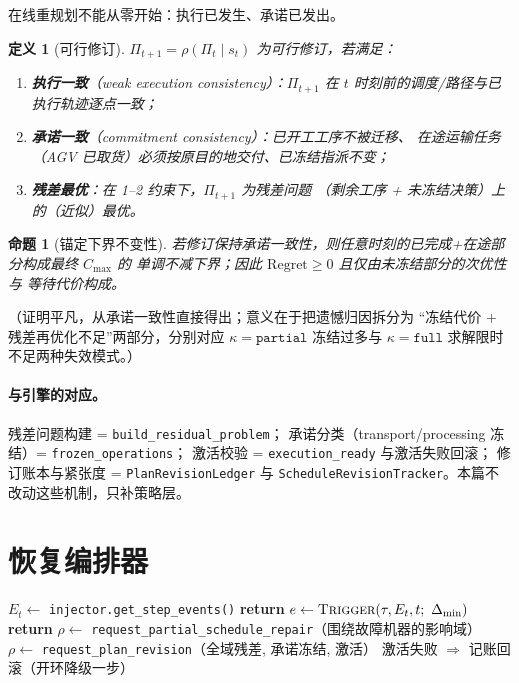 \documentclass[UTF8,12pt,a4paper]{ctexart}
\newtheorem{definition}{定义}
\newtheorem{proposition}{命题}
\newcommand{\Cmax}{C_{\max}}
\begin{document}
在线重规划不能从零开始：执行已发生、承诺已发出。

\begin{definition}[可行修订]
$\Pi_{t+1}=\rho(\Pi_t\mid s_t)$ 为可行修订，若满足：
\begin{enumerate}
  \item \textbf{执行一致}（weak execution consistency）：$\Pi_{t+1}$ 在
    $t$ 时刻前的调度/路径与已执行轨迹逐点一致；
  \item \textbf{承诺一致}（commitment consistency）：已开工工序不被迁移、
    在途运输任务（AGV 已取货）必须按原目的地交付、已冻结指派不变；
  \item \textbf{残差最优}：在 1--2 约束下，$\Pi_{t+1}$ 为残差问题
    （剩余工序 + 未冻结决策）上的（近似）最优。
\end{enumerate}
\end{definition}

\begin{proposition}[锚定下界不变性]
若修订保持承诺一致性，则任意时刻的已完成+在途部分构成最终 $\Cmax$ 的
单调不减下界；因此 $\mathrm{Regret}\ge 0$ 且仅由未冻结部分的次优性与
等待代价构成。
\end{proposition}
（证明平凡，从承诺一致性直接得出；意义在于把遗憾归因拆分为
``冻结代价 + 残差再优化不足''两部分，分别对应 $\kappa=\texttt{partial}$
冻结过多与 $\kappa=\texttt{full}$ 求解限时不足两种失效模式。）

\paragraph{与引擎的对应。}残差问题构建 = \texttt{build\_residual\_problem}；
承诺分类（transport/processing 冻结）= \texttt{frozen\_operations}；
激活校验 = \texttt{execution\_ready} 与激活失败回滚；
修订账本与紧张度 = \texttt{PlanRevisionLedger} 与
\texttt{ScheduleRevisionTracker}。本篇不改动这些机制，只补策略层。

\section{恢复编排器}\label{sec:orch}

\begin{algorithm}[h]
\caption{Recovery Orchestrator（每步调用）}
\begin{algorithmic}[1]
\State $E_t \gets$ \texttt{injector.get\_step\_events()}
 \State \textbf{return} \EndIf
\State $e \gets \textsc{Trigger}(\tau, E_t, t;\ \Delta_{\min})$ 
 \State \textbf{return} \EndIf
{}
  \State $\rho \gets$ \texttt{request\_partial\_schedule\_repair}（围绕故障机器的影响域）
  \State $\rho \gets$ \texttt{request\_plan\_revision}（全域残差, 承诺冻结, 激活）
\EndIf
\State 激活失败 $\Rightarrow$ 记账回滚（开环降级一步）
\end{algorithmic}
\end{algorithm}
\end{document}

